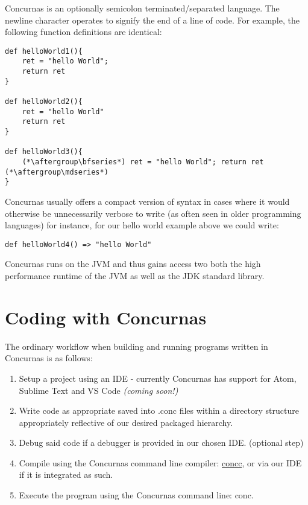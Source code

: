 \documentclass[conc-doc]{subfiles}
\begin{document}
Concurnas is an optionally semicolon terminated/separated language. The newline character operates to signify the end of a line of code. For example, the following function definitions are identical:

\begin{lstlisting}
def helloWorld1(){
	ret = "hello World";
	return ret
}

def helloWorld2(){
	ret = "hello World"
	return ret
}

def helloWorld3(){	
	(*\aftergroup\bfseries*) ret = "hello World"; return ret (*\aftergroup\mdseries*)
}
\end{lstlisting}

Concurnas usually offers a compact version of syntax in cases where it would otherwise be unnecessarily verbose to write (as often seen in older programming languages) for instance, for our hello world example above we could write:

\begin{lstlisting}
def helloWorld4() => "hello World"
\end{lstlisting}

Concurnas runs on the JVM and thus gains access two both the high performance runtime of the JVM as well as the JDK standard library.

\section{Coding with Concurnas}

The ordinary workflow when building and running programs written in Concurnas is as follows:

\begin{enumerate}
	\item Setup a project using an IDE - currently Concurnas has support for Atom, Sublime Text and VS Code  \textit{(coming soon!)}
	\item Write code as appropriate saved into .conc files within a directory structure appropriately reflective of our desired packaged hierarchy.
	\item Debug said code if a debugger is provided in our chosen IDE. (optional step)
	\item Compile using the Concurnas command line compiler: \hyperref[ch:concc]{concc}, or via our IDE if it is integrated as such.
	\item Execute the program using the Concurnas command line: conc.
\end{enumerate}
\end{document}
